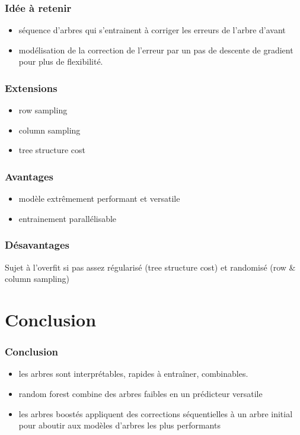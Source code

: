 \documentclass{formation}
\begin{document}
\begin{frame}
  \frametitle{Idée à retenir}

  \begin{itemize}
  \item séquence d'arbres qui s'entrainent à corriger les erreurs de
    l'arbre d'avant
  \item modélisation de la correction de l'erreur par un pas de
    descente de gradient pour plus de flexibilité.
  \end{itemize}
   
\end{frame}

\begin{frame}
  \frametitle{Extensions}

  \begin{itemize}
  \item row sampling
  \item column sampling
  \item tree structure cost
  \end{itemize}
\end{frame}

\begin{frame}
  \frametitle{Avantages}

  \begin{itemize}
  \item modèle extrêmement performant et versatile
  \item entrainement parallélisable
  \end{itemize}
\end{frame}

\begin{frame}
  \frametitle{Désavantages}

  Sujet à l'overfit si pas assez régularisé (tree structure cost) et
  randomisé (row \& column sampling)
\end{frame}

\section{Conclusion}
\begin{frame}
  \frametitle{Conclusion}

  \begin{itemize}
  \item les arbres sont interprétables, rapides à entraîner,
    combinables.
  \item random forest combine des arbres faibles en un prédicteur
    versatile
  \item les arbres boostés appliquent des corrections séquentielles à
    un arbre initial pour aboutir aux modèles d'arbres les plus
    performants
  \end{itemize}
\end{frame}
\end{document}

